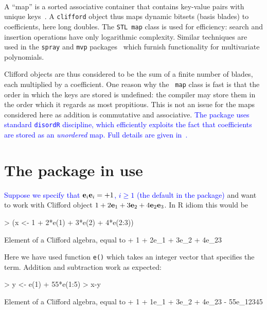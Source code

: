 \documentclass{birkjour}
\theoremstyle{definition}
\theoremstyle{remark}
\numberwithin{equation}{section}
\begin{document}
{\ }\\[10pt]

A ``map'' is a sorted associative container that contains key-value
pairs with unique keys~\cite{musser2009}.  A {\tt clifford} object
thus maps dynamic bitsets (basis blades) to coefficients, here long
doubles.  The {\tt STL map} class is used for efficiency: search and
insertion operations have only logarithmic complexity.  Similar
techniques are used in the {\tt spray} and {\tt mvp}
packages~\cite{hankin2022_mvp,hankin2022_spray} which furnish
functionality for multivariate polynomials.

Clifford objects are thus considered to be the sum of a finite number
of blades, each multiplied by a coefficient.  One reason why the {\tt
  map} class is fast is that the order in which the keys are stored is
undefined: the compiler may store them in the order which it regards
as most propitious.  This is not an issue for the maps considered here
as addition is commutative and associative.  \textcolor{blue}{The
  package uses standard {\tt disordR} discipline, which efficiently
  exploits the fact that coefficients are stored as an {\em unordered}
  map.  Full details are given in~\cite{hankin2022_disordR}.
}

\section{The package in use}

\textcolor{blue}{Suppose we specify that ${\bf e}_{i}{\bf e}_{i}=+1$,
  $i\geqslant 1$ (the default in the package)} and want to work with
Clifford object $1+2{\bf e}_{1}+3{\bf e}_{2}+4{\bf e}_{2}{\bf e}_{3}$.  In R idiom this
would be

\begin{Schunk}
\begin{Sinput}
> (x <- 1 + 2*e(1) + 3*e(2) + 4*e(2:3))
\end{Sinput}
\begin{Soutput}
Element of a Clifford algebra, equal to
+ 1 + 2e_1 + 3e_2 + 4e_23
\end{Soutput}
\end{Schunk}

Here we have used function {\tt e()} which takes an integer vector that
specifies the term.  Addition and subtraction work as expected:

\begin{Schunk}
\begin{Sinput}
> y <- e(1) + 55*e(1:5)
> x-y
\end{Sinput}
\begin{Soutput}
Element of a Clifford algebra, equal to
+ 1 + 1e_1 + 3e_2 + 4e_23 - 55e_12345
\end{Soutput}
\end{Schunk}
\end{document}
